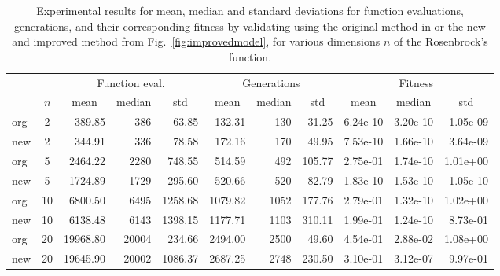 \documentclass[conference]{IEEEtran}
\begin{document}
\begin{table}[t!]
\centering
{\renewcommand{\arraystretch}{1.1} \renewcommand{\tabcolsep}{0.03cm} \scriptsize%
\begin{tabularx}{0.99\columnwidth}{| X | c | rrr | rrr| rrr |}
\hline
 & & \multicolumn{3}{c|}{Function eval.} & \multicolumn{3}{c|}{Generations} & \multicolumn{3}{c|}{Fitness} \\ 
     & $n$ & \multicolumn{1}{|c}{mean} & \multicolumn{1}{c}{median} & \multicolumn{1}{c|}{std} & \multicolumn{1}{|c}{mean} & \multicolumn{1}{c}{median} & \multicolumn{1}{c|}{std} & \multicolumn{1}{|c}{mean} & \multicolumn{1}{c}{median} & \multicolumn{1}{c|}{std} \\
\hline
org & 2 & 389.85 & 386 & 63.85 & 132.31 & 130 & 31.25 & 6.24e-10 & 3.20e-10 & 1.05e-09\\ 
new & 2 & 344.91 & 336 & 78.58 & 172.16 & 170 & 49.95 & 7.53e-10 & 1.66e-10 & 3.64e-09\\ \hline
org & 5 & 2464.22 & 2280 & 748.55 & 514.59 & 492 & 105.77 & 2.75e-01 & 1.74e-10 & 1.01e+00\\ 
new & 5 & 1724.89 & 1729 & 295.60 & 520.66 & 520 & 82.79 & 1.83e-10 & 1.53e-10 & 1.05e-10\\ \hline
org & 10 & 6800.50 & 6495 & 1258.68 & 1079.82 & 1052 & 177.76 & 2.79e-01 & 1.32e-10 & 1.02e+00\\ 
new & 10 & 6138.48 & 6143 & 1398.15 & 1177.71 & 1103 & 310.11 & 1.99e-01 & 1.24e-10 & 8.73e-01\\ \hline
org & 20 & 19968.80 & 20004 & 234.66 & 2494.00 & 2500 & 49.60 & 4.54e-01 & 2.88e-02 & 1.08e+00\\ 
new & 20 & 19645.90 & 20002 & 1086.37 & 2687.25 & 2748 & 230.50 & 3.10e-01 & 3.12e-07 & 9.97e-01\\ \hline
\end{tabularx}
}
\caption{Experimental results for mean, median and standard deviations for function evaluations, generations, 
and their corresponding fitness by validating using the original method in \cite{Ru06:PPSN} or the new and improved method from Fig.~\ref{fig:improvedmodel}, for various dimensions $n$ of the Rosenbrock's function.} \label{tbl:Rosenbrock}
\end{table}
\end{document}
